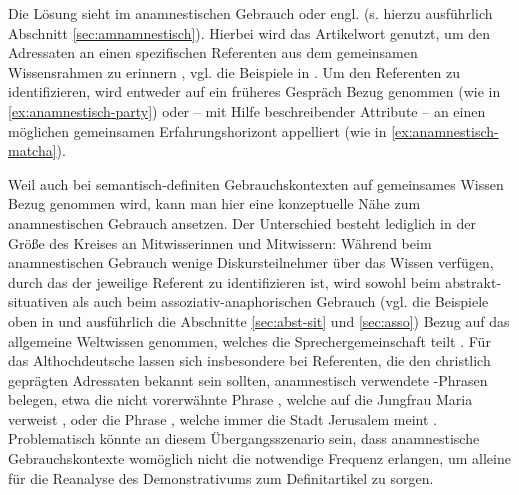 \noindent
Die Lösung sieht \textcite{Himmelmann1997} im anamnestischen Gebrauch oder engl.  (s. hierzu ausführlich Abschnitt \ref{sec:amnamnestisch}). Hierbei wird das Artikelwort genutzt, um den Adressaten an einen spezifischen Referenten aus dem gemeinsamen Wissensrahmen zu erinnern \parencite[61 und 81]{Himmelmann1997}, vgl. die Beispiele in . Um den Referenten zu identifizieren, wird  entweder auf ein früheres Gespräch Bezug genommen (wie in \ref{ex:anamnestisch-party}) oder -- mit Hilfe beschreibender Attribute --  an einen möglichen gemeinsamen Erfahrungshorizont appelliert (wie in \ref{ex:anamnestisch-matcha}).  

 \begin{exe}
	\ex 
	\begin{xlist} \label{ex:himmelmann}
		\ex \label{ex:anamnestisch-party}  
		\ex \label{ex:anamnestisch-matcha}   
		\end{xlist}
\end{exe}

\noindent
Weil auch bei semantisch-definiten Gebrauchskontexten auf gemeinsames Wissen Bezug genommen wird, kann man hier eine konzeptuelle Nähe zum anamnestischen Gebrauch ansetzen. Der Unterschied besteht lediglich in der Größe des Kreises an Mitwisserinnen und Mitwissern: Während beim anamnestischen Gebrauch wenige  Diskursteilnehmer über das Wissen verfügen, durch das der jeweilige Referent zu identifizieren ist,  wird sowohl beim abstrakt-situativen als auch beim assoziativ-anaphorischen Gebrauch (vgl. die Beispiele oben in  und ausführlich die Abschnitte \ref{sec:abst-sit} und \ref{sec:asso}) Bezug auf das allgemeine Weltwissen genommen, welches die Sprechergemeinschaft teilt \parencite[95]{Himmelmann1997}. Für das Althochdeutsche lassen sich insbesondere bei Referenten, die den christlich geprägten Adressaten bekannt sein sollten, anamnestisch verwendete -Phrasen belegen, etwa die nicht vorerwähnte Phrase , welche auf die Jungfrau Maria verweist \parencite[74]{Szczepaniak2011a}, oder die Phrase , welche immer die Stadt Jerusalem meint \parencite{Flick2018}. Problematisch könnte an diesem Übergangsszenario sein, dass anamnestische Gebrauchskontexte womöglich nicht die notwendige Frequenz erlangen, um alleine für die Reanalyse des Demonstrativums zum Definitartikel zu sorgen. 

